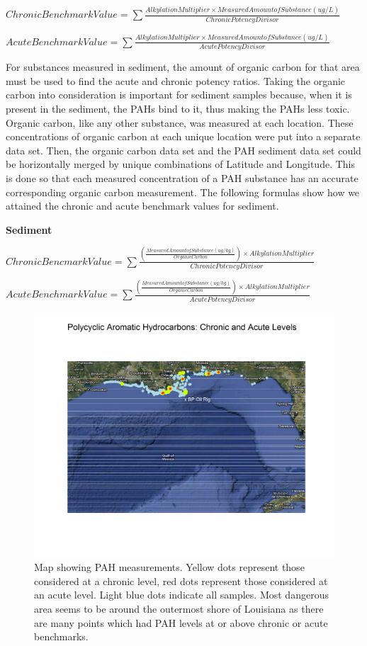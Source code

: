 \documentclass[authoryear,12pt]{elsarticle}
\begin{document}
$Chronic Benchmark Value = \sum \frac{Alkylation Multiplier \times Measured Amount of Substance (ug/L)}{Chronic Potency Divisor}$

$Acute Benchmark Value = \sum \frac{Alkylation Multiplier \times Measured Amount of Substance (ug/L)}{Acute Potency Divisor}$


For substances measured in sediment, the amount of organic carbon for that area must  be used to find the acute and chronic potency ratios. Taking the organic carbon into consideration is important for sediment samples because, when it is present in the sediment, the PAHs bind to it, thus making the PAHs less toxic. Organic carbon, like any other substance, was measured at each location. These concentrations of organic carbon at each unique location were put into a separate data set. Then, the organic carbon data set and the PAH sediment data set could be horizontally merged by unique combinations of Latitude and Longitude. This is done so that each measured concentration of a PAH substance has an accurate corresponding organic carbon measurement. The following formulas show how we attained the chronic and acute benchmark values for sediment.
\begin{center} \textbf{Sediment} \end{center}
$Chronic Bencmark Value = \sum \frac{(\frac{Measured Amount of Substance (ug/kg)}{Organic Carbon}) \times Alkylation Multiplier}{Chronic Potency Divisor}$

$Acute Benchmark Value = \sum \frac{(\frac{Measured Amount of Substance (ug/kg)}{Organic Carbon}) \times Alkylation Multiplier}{Acute Potency Divisor}$


\begin{figure}[htbp] %
   \centering
   \includegraphics[width=5in]{chron-acute-map.png} 
   \caption{Map showing PAH measurements. Yellow dots represent those considered at a chronic level, red dots represent those considered at an acute level.  Light blue dots indicate all samples.  Most dangerous area seems to be around the outermost shore of Louisiana as there are many points which had PAH levels at or above chronic or acute benchmarks.}
   \label{pah-map}
\end{figure}
\end{document}
